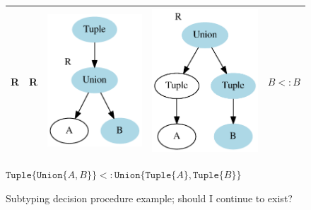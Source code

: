 \documentclass[a4paper,english]{lipics-v2019}
\newcommand{\xt}[1]{\texttt{#1}}
\newcommand{\union}[2]{\xt{Union\{}#1,#2\xt{\}}}
\newcommand{\tuple}[1]{\xt{Tuple\{}#1\xt{\}}}
\newcommand{\goodcell}{\cellcolor{green!25}}
\begin{document}
\begin{figure}[h]
\begin{tabular}{cc|cc|c}
\goodcell R & \goodcell R & \goodcell \includegraphics[scale=0.3]{figures-gen/left2.pdf} & \goodcell \includegraphics[scale=0.3]{figures-gen/right2.pdf}  
    & \goodcell ${B} <: {B}$ \\
\hline
\end{tabular}

\hspace{1em}

$\tuple{\union{A}{B}} <: \union{\tuple{A}}{\tuple{B}}$

\caption{Subtyping decision procedure example; should I continue to exist?}\label{fig:cfs}
\end{figure}
\end{document}
